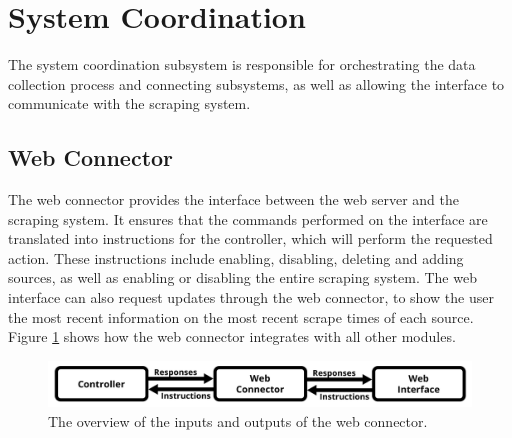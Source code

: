 \documentclass{l4proj}
\begin{document}
\section{System Coordination}
The system coordination subsystem is responsible for orchestrating the data collection process and connecting subsystems, as well as allowing the interface to communicate with the scraping system.
\subsection{Web Connector}
The web connector provides the interface between the web server and the scraping system. It ensures that the commands performed on the interface are translated into instructions for the controller, which will perform the requested action. These instructions include enabling, disabling, deleting and adding sources, as well as enabling or disabling the entire scraping system. The web interface can also request updates through the web connector, to show the user the most recent information on the most recent scrape times of each source. Figure \ref{fig:web-connector-diagram} shows how the web connector integrates with all other modules.
 \begin{figure}[h]
\centering
\includegraphics[width=\textwidth]{images/Web-connector-diagram.png}
\caption{The overview of the inputs and outputs of the web connector.}
\label{fig:web-connector-diagram}
\end{figure}
\end{document}
